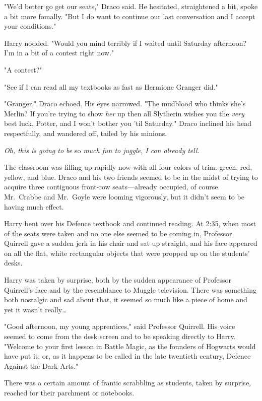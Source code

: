 "We'd better go get our seats," Draco said. He hesitated, straightened a bit, 
spoke a bit more fomally. "But I do want to continue our last conversation and 
I accept your conditions."

Harry nodded. "Would you mind terribly if I waited until Saturday afternoon? 
I'm in a bit of a contest right now."

"A contest?"

"See if I can read all my textbooks as fast as Hermione Granger did."

"Granger," Draco echoed. His eyes narrowed. "The mudblood who thinks she's 
Merlin? If you're trying to show \emph{her} up then all Slytherin wishes you 
the \emph{very} best luck, Potter, and I won't bother you 'til Saturday." Draco 
inclined his head respectfully, and wandered off, tailed by his minions.

\emph{Oh, this is going to be} so\emph{ much fun to juggle, I can already tell.}

The classroom was filling up rapidly now with all four colors of trim: green, 
red, yellow, and blue. Draco and his two friends seemed to be in the midst of 
trying to acquire three contiguous front-row seats---already occupied, of 
course. Mr.~Crabbe and Mr.~Goyle were looming vigorously, but it didn't seem to 
be having much effect.

Harry bent over his Defence textbook and continued reading.
\sbreak
At 2:35\PM, when most of the seats were taken and no one else seemed to be 
coming in, Professor Quirrell gave a sudden jerk in his chair and sat up 
straight, and his face appeared on all the flat, white rectangular objects that 
were propped up on the students' desks.

Harry was taken by surprise, both by the sudden appearance of Professor 
Quirrell's face and by the resemblance to Muggle television. There was 
something both nostalgic and sad about that, it seemed so much like a piece of 
home and yet it wasn't really{\ldots}

"Good afternoon, my young apprentices," said Professor Quirrell. His voice 
seemed to come from the desk screen and to be speaking directly to Harry. 
"Welcome to your first lesson in Battle Magic, as the founders of Hogwarts 
would have put it; or, as it happens to be called in the late twentieth 
century, Defence Against the Dark Arts."

There was a certain amount of frantic scrabbling as students, taken by 
surprise, reached for their parchment or notebooks.

